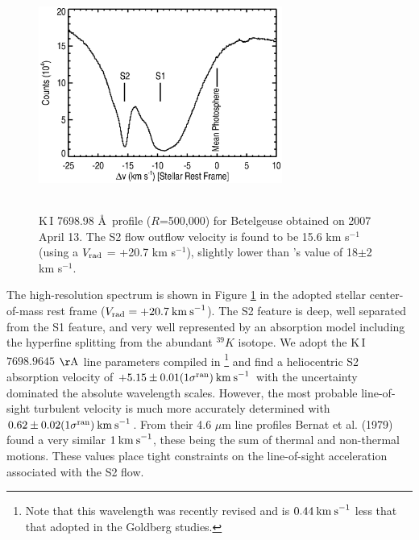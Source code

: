 \documentclass[iop]{emulateapj}
\begin{document}
\begin{figure}
\includegraphics[trim=40pt 0pt 50pt 0pt, width=8.0cm, height=7.5cm]{f18.eps}
\caption{K\,I 7698.98 \AA \  profile ($R$=500,000) for Betelgeuse obtained on 2007 April 13. The S2 flow outflow velocity is found to be 15.6 km s${}^{-1}$ (using a $V_{\rm{rad}}$ = +20.7 km s${}^{-1}$), slightly lower than \citeauthor{2002A&A...386.1009P}'s \citeyearpar{2002A&A...386.1009P} value of 18$\pm$2 km s${}^{-1}$.}
\label{fig:fig7}
\end{figure}

The high-resolution spectrum is shown in Figure \ref{fig:fig7} in the adopted stellar center-of-mass rest frame ($V_{\rm{rad}}=+20.7\>{\rm km\>s}^{-1}$). The S2 feature is deep, well separated from the S1 feature, and very well represented by an absorption model including the hyperfine splitting from the abundant $^{39}K$ isotope. We adopt the K\,I $7698.9645$ $\rm{\AA}$ line parameters compiled in \cite{2003ApJS..149..205M}\footnote{Note that this wavelength was recently revised and is $0.44\>{\rm km\>s}^{-1}$ less that that adopted in the Goldberg studies.} and find a heliocentric S2 absorption velocity of $+5.15\pm 0.01(1\sigma^{\rm{ran}})\>{\rm km\>s}^{-1}$ with the uncertainty dominated the absolute wavelength scales. However, the most probable line-of-sight turbulent velocity is much more accurately determined with $0.62\pm 0.02(1\sigma^{\rm{ran}}) \>{\rm km\>s}^{-1}$. From their 4.6 $\mu$m line profiles Bernat et al. (1979) found a very similar $1\>{\rm km\>s}^{-1}$, these being the sum of thermal and non-thermal motions. These values place tight constraints on the line-of-sight 
acceleration associated with the S2 flow. 
\end{document}

